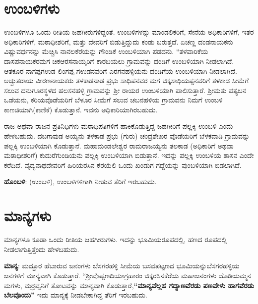 \section{ಉಂಬಳಿಗಳು}

ಉಂಬಳಿಗಳೂ ಒಂದು ರೀತಿಯ ಜಹಗೀರುಗಳಿದ್ದಂತೆ. ಉಂಬಳಿಗಳನ್ನು ಮಾಂಡಲಿಕರಿಗೆ, ಸೇನೆಯ ಅಧಿಕಾರಿಗಳಿಗೆ, ಇತರ ಅಧಿಕಾರಿಗಳಿಗೆ, ಮಠಾಧೀಶರಿಗೆ, ಮತ್ತು ದೇವರಿಗೆ ಬಿಡುತ್ತಿದ್ದುದು ಕಂಡು ಬರುತ್ತದೆ. ಏಚಣ್ಣ ದಂಡನಾಯಕನು ವಿಷ್ಣುವರ್ಧನನ್ನು ಮೆಚ್ಚಿಸಿ ನಾನಲಕೆರೆಯನ್ನು ಗೌಂಡಿಕೆ ಉಂಬಳಿಯಾಗಿ ಪಡದನು.\textbf{ } “ತಳವಾರಿಕೆಯ ದಾಸಪನಾಯಕರ\break ಮಗ ಚಿಕಆರಸನಾಯ್ಕರಿಗೆ ಕಾರಬಯಲು ಗ್ರಾಮವನ್ನು ದಂಡಿಗೆ ಉಂಬಳಿಯಾಗಿ ನೀಡಲಾಗಿದೆ. ಆತಕೂರ ನಾಗಪ್ಪಗಉಡ ಲಿಂಗಪ್ಪ ಗಉಡನವರಿಗೆ ಎರಗನಹಳ್ಳಿಯನು ದಂಡಿಗೆಯ ಉಂಬಳಿಯಾಗಿ ನೀಡಲಾಗಿದೆ. ಅಚ್ಚುತರಾಯ ವೀರಣನಾಯಕರು ತಳಕಾಡನಾಡ ಪ್ರಭು ಸಾಧಿಪನವರ ಮಗ ಚಿಕ್ಕಸಾಧಿಯಪ್ಪನವರಿಗೆ ತಳಕಾಡ ಸೀಮೆಗೆ ಸಲುವ ದನುಗೂರಸ್ಥಳದ ಹಲಸನಹಳ್ಳಿ ಗ್ರಾಮವನ್ನು ಶ‍್ರೀ ರಾಯರ ಉಂಬಳಿಯಾಗಿ ಪಾಲಿಸುತ್ತಾರೆ.\textbf{ }ಶ‍್ರೀಮತು ಪತ್ಯಬನ ಒಡೆಯನು, ಕರಿಯವೊಡೆಯರಿಗೆ ಬೆಳೂರ ಸೀಮೆಗೆ ಸಲುವ ಚಬನಹಳಿಯ ಗ್ರಾಮವನು ನಿಮಗೆ ಉಂಬಳಿ ಕಾಣಚಿಯಾಗಿ(ಕಾಣಿಕೆ) ಕೊಡುತ್ತಾನೆ. ಇವನು ಅಧಿಕಾರಿಯಾಗಿರಬಹುದು.

ರಾಜ ಅಥವಾ ರಾಜನ ಪ್ರತಿನಿಧಿಗಳು ಮಠಾಧಿಪತಿಗಳಿಗೆ ಹಾಕಿಕೊಡುತ್ತಿದ್ದ ಜಹಗೀರಿಗೆ ಪಲ್ಲಕ್ಕಿ ಉಂಬಳಿ ಎಂದು ಹೇಳಬಹುದು. ದಬಗಾವುಡ ಅಯ್ಯನು ತಳಕಾಡ ಪ್ರಭು (ಗುರು) ಚಂದ್ರಶೇಖರ ವೊಡೆಯರಿಗೆ ಬೆಳಕವಾಡಿ ಗ್ರಾಮವನ್ನು ಪಲ್ಲಕ್ಕಿ ಉಂಬಳಿಯಾಗಿ ಕೊಡುತ್ತಾನೆ. ಮಹಾಮಂಡಲೇಶ್ವರ ರಾಮರಾಜಯ್ಯನು ತಲಕಾಡ (ಅಧಿಕಾರಿಗೆ ಅಥವಾ ಮಠಾಧೀಶರಿಗೆ) ಕುದುರೆಗುಂಡಿಯನು ಪಲ್ಲಕ್ಕಿ ಉಂಬಳಿಯಾಗಿ ಬಿಡುತ್ತಾನೆ. ಇದನ್ನು ಪಲ್ಲಕ್ಕಿ ಉಂಬಳಿಯ ಶಾಸನ ಎಂದೇ ಕರೆದಿದೆ. ವೈದ್ಯನಾಥದೇವರಿಗೆ ಹಿರಿಯರಸಿನ ಕೆರಯೆಲಿ ಒಂದು ಖಂಡುಗ ಗದ್ದೆಯನ್ನು ವುಂಬಳಿಯಾಗಿ ಬಿಡಲಾಗಿದೆ.

\textbf{ಹೊಂಬಳಿ}: (ಉಂಬಳಿ), ಉಂಬಳಿಗಳಿಗಾಗಿ ನೀಡುವ ತೆರಿಗೆ ಇರಬಹುದು.


\section{ಮಾನ್ಯಗಳು}

ಮಾನ್ಯಗಳೂ ಕೂಡಾ ಒಂದು ರೀತಿಯ ಜಹಗೀರುಗಳು. ಇದನ್ನು ಭೂಮಿಯರೂಪದಲ್ಲಿ, ಹಣದ ರೂಪದಲ್ಲಿ ನೀಡಲಾಗುತ್ತಿತ್ತೆಂದು ಹೇಳಬಹುದು.

\textbf{ಮಾನ್ಯ}: ಮದ್ದೂರ ಹೆಬಾರುವ ಜನಂಗಳು ಬೆಸಗರಹಳ್ಳಿ ಸೀಮೆಯ ಬಸವಪಟ್ಟಣದ ಭೂಮಿಯನ್ನು\break ಬೆಸಗರಹಳ್ಳಿಯ ಜನಗಳಿಗೆ ಮಾನ್ಯವಾಗಿ ಕೊಡುತ್ತಾರೆ. “ಶ‍್ರೀವೊಪ್ಪಣದಿಯಾಗ್ರಹಾರಂ ಚಿಕ್ಕರಸಿನಕೆರೆಯ ಮಹಾಜನಂಗಳು ದೊಡಿಯಮ್ಮನ ಮಗಳು, ಮರ್ರವ್ವನಿಗೆ ತೋಟವನ್ನು ಮಾನ್ಯವಾಗಿ ಕೊಡುತ್ತಾರೆ,\textbf{“ಮಾನ್ಯವೆಲ್ಲಹ ಗದ್ಯಾಣವೆರಡು ಪಣವೇಳು ಹಾಗವೆರಡು ಬೆಲವೊಂದು”} ಇದು ಮಾನ್ಯಕ್ಕೆ ನೀಡಬೇಕಾಗಿದ್ದ ತೆರಿಗೆ ಇರಬಹುದು.

